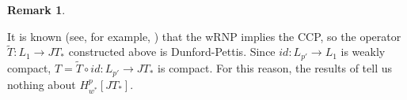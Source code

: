 \documentclass{amsart}
\theoremstyle{plain}
\theoremstyle{definition}
\newtheorem{remark}[theorem]{Remark}
\numberwithin{equation}{section}
\newcommand{\ball}{\mathrm{B}}
\newcommand{\Hp}{H_{w^*}^{p}}
\begin{document}
\begin{remark}\label{bourgain}

It is known (see, for example, \cite[Chapter 7]{Talagrand}) that the wRNP implies the CCP, so the operator $\widetilde{T}: L_1 \to JT_*$ constructed above is Dunford-Pettis. Since $id: L_{p'} \to L_1$ is weakly compact, $T = \widetilde{T} \circ id : L_{p'} \to JT_*$ is compact. For this reason, the results of  tell us nothing about $\Hp[JT_*]$.
\end{remark}
\end{document}

